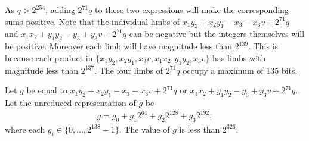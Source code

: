 \documentclass[a4paper, 12pt]{article}
\begin{document}
As $q > 2^{254}$, adding $2^{71}q$ to these two expressions will make the corresponding sums positive. Note that the individual limbs of $x_1y_2+x_2y_1-x_3-x_3v + 2^{71}q$ and $x_1x_2 + y_1y_2 -y_3 + y_3 v + 2^{71}q$ can be negative but the integers themselves will be positive. Moreover each limb will have magnitude less than $2^{139}$. This is because each product in $\{x_1y_2, x_2y_1, x_3v, x_1x_2, y_1y_2, x_3v\}$ has limbs with magnitude less than $2^{137}$. The four limbs of $2^{71}q$ occupy a maximum of 135 bits.


Let $g$ be equal to $x_1y_2+x_2y_1-x_3-x_3v + 2^{71}q$ or $x_1x_2 + y_1y_2 -y_3 + y_3 v + 2^{71}q$. Let the unreduced representation of $g$ be
\begin{align*}
  g = g_0 + g_1 2^{64} + g_2 2^{128} + g_3 2^{192},
\end{align*}
where each $g_i \in \{0,\ldots,2^{138}-1\}$. The value of $g$ is less than $2^{326}$.
\end{document}
